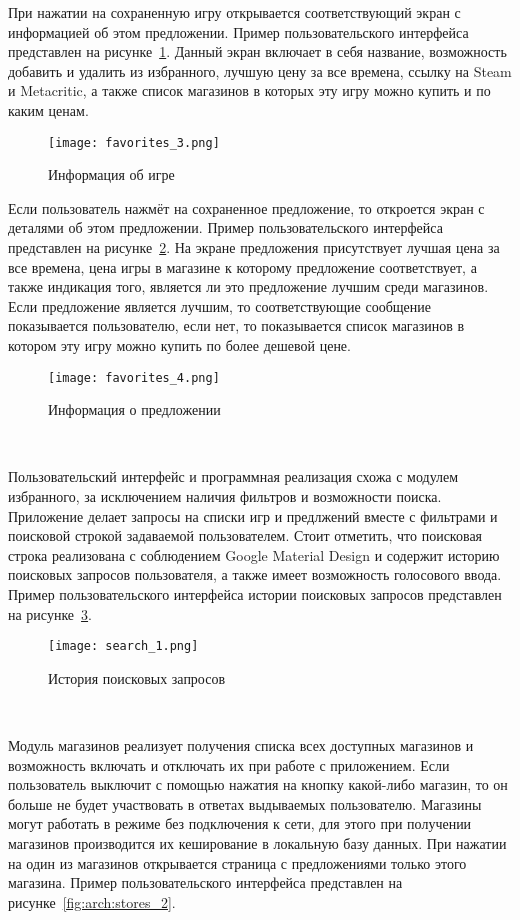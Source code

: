 При нажатии на сохраненную игру открывается соответствующий экран с информацией об этом предложении. Пример пользовательского интерфейса представлен на рисунке~\ref{fig:arch:favorites_3}. Данный экран включает в себя название, возможность добавить и удалить из избранного, лучшую цену за все времена, ссылку на Steam и Metacritic, а также список магазинов в которых эту игру можно купить и по каким ценам.

\begin{figure}[H]
 \centering
   \texttt{[image: favorites\_3.png]} 
   \caption{Информация об игре}
   \label{fig:arch:favorites_3}
\end{figure}

Если пользователь нажмёт на сохраненное предложение, то откроется экран с деталями об этом предложении. Пример пользовательского интерфейса представлен на рисунке~\ref{fig:arch:favorites_4}. На экране предложения присутствует лучшая цена за все времена, цена игры в магазине к которому предложение соответствует, а также индикация того, является ли это предложение лучшим среди магазинов. Если предложение является лучшим, то соответствующие сообщение показывается пользователю, если нет, то показывается список магазинов в котором эту игру можно купить по более дешевой цене.

\begin{figure}[H]
 \centering
   \texttt{[image: favorites\_4.png]} 
   \caption{Информация о предложении}
   \label{fig:arch:favorites_4}
\end{figure}


~\par
Пользовательский интерфейс и программная реализация схожа с модулем избранного, за исключением наличия фильтров и возможности поиска. Приложение делает запросы на списки игр и предлжений вместе с фильтрами и поисковой строкой задаваемой пользователем. Стоит отметить, что поисковая строка реализована с соблюдением Google Material Design и содержит историю поисковых запросов пользователя, а также имеет возможность голосового ввода. Пример пользовательского интерфейса истории поисковых запросов представлен на рисунке~\ref{fig:arch:search_1}.

\begin{figure}[H]
 \centering
   \texttt{[image: search\_1.png]} 
   \caption{История поисковых запросов}
   \label{fig:arch:search_1}
\end{figure}

~\par
Модуль магазинов реализует получения списка всех доступных магазинов и возможность включать и отключать их при работе с приложением. Если пользователь выключит с помощью нажатия на кнопку какой-либо магазин, то он больше не будет участвовать в ответах выдываемых пользователю. Магазины могут работать в режиме без подключения к сети, для этого при получении магазинов производится их кеширование в локальную базу данных. При нажатии на один из магазинов открывается страница с предложениями только этого магазина. Пример пользовательского интерфейса представлен на рисунке~\ref{fig:arch:stores_2}.

